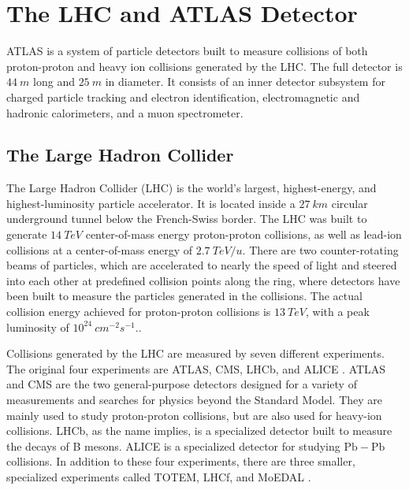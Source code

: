 \chapter{The LHC and ATLAS Detector}\label{ch:atlas}

ATLAS is a system of particle detectors built to measure collisions of both proton-proton and heavy ion collisions
generated by the LHC.\cite{atlas-detector-2008}
The full detector is $44~m$ long and $25~m$ in diameter.
It consists of an inner detector subsystem for charged particle tracking and electron identification,
electromagnetic and hadronic calorimeters, and a muon spectrometer.

\section{The Large Hadron Collider}\label{sec:lhc}

The Large Hadron Collider (LHC) is the world's largest, highest-energy, and highest-luminosity particle accelerator.
It is located inside a $27~km$ circular underground tunnel below the French-Swiss border.
The LHC was built to generate $14~TeV$ center-of-mass energy proton-proton collisions,
as well as lead-ion collisions at a center-of-mass energy of $2.7~TeV/u$.
There are two counter-rotating beams of particles,
which are accelerated to nearly the speed of light and steered into each other at predefined collision points along the
ring, where detectors have been built to measure the particles generated in the collisions.
The actual collision energy achieved for proton-proton collisions is $13~TeV$,
with a peak luminosity of $10^{24}~cm^{-2}s^{-1}$.\cite{lhc-guide-2017}.

Collisions generated by the LHC are measured by seven different experiments.
The original four experiments are ATLAS, CMS, LHCb, and ALICE .
ATLAS and CMS are the two general-purpose detectors designed for a variety of measurements and searches for physics
beyond the Standard Model.
They are mainly used to study proton-proton collisions, but are also used for heavy-ion collisions.
LHCb, as the name implies, is a specialized detector built to measure the decays of B mesons.
ALICE is a specialized detector for studying $\mathrm{Pb}-\mathrm{Pb}$ collisions.
In addition to these four experiments, there are three smaller, specialized experiments called TOTEM, LHCf, and MoEDAL .

